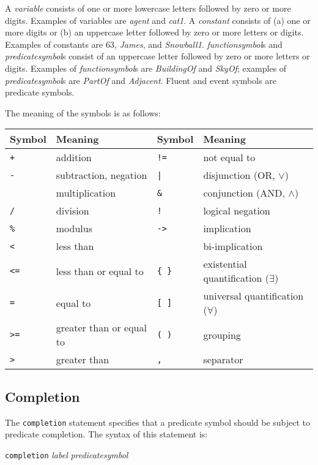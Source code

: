\documentclass{article}
\begin{document}
A {\em variable} consists of one or more lowercase letters followed by
zero or more digits. Examples of variables are {\em agent} and
{\em cat1}.
A {\em constant} consists of (a) one or more digits or (b) an
uppercase letter followed by zero or more letters or digits. Examples
of constants are 63, {\em James}, and {\em Snowball1}.
{\em functionsymbol}s and {\em predicatesymbol}s consist of an
uppercase letter followed by zero or more letters or digits. Examples
of {\em functionsymbol}s are {\em BuildingOf} and {\em SkyOf}; examples of
{\em predicatesymbol}s are {\em PartOf} and {\em Adjacent}.
Fluent and event symbols are predicate symbols.

The meaning of the symbols is as follows:
\begin{center}
\begin{tabular}{|l|l|l|l|} \hline
{\bf Symbol} & {\bf Meaning} & {\bf Symbol} & {\bf Meaning} \\ \hline
{\tt +} & addition &
{\tt !=} & not equal to \\ \hline
{\tt -}  & subtraction, negation &
{\tt |} & disjunction (OR, $\vee$) \\ \hline
{\tt *} & multiplication &
{\tt \&} & conjunction (AND, $\wedge$) \\ \hline
{\tt /} & division &
{\tt !} & logical negation \\ \hline
{\tt \%} & modulus &
{\tt ->} & implication \\ \hline
{\tt <} & less than &
{\tt <->} & bi-implication \\ \hline
{\tt <=} & less than or equal to &
{\tt \{ \}} & existential quantification ($\exists$) \\ \hline
{\tt =} & equal to &
{\tt [ ]} & universal quantification ($\forall$) \\ \hline
{\tt >=} & greater than or equal to &
{\tt ( )} & grouping \\ \hline
{\tt >} & greater than & {\tt ,} & separator \\ \hline
\end{tabular}
\end{center}

\subsection{Completion}
The {\tt completion} statement specifies that a predicate symbol should
be subject to predicate completion. The syntax of this statement is:
\begin{flushleft}
{\tt completion} {\em label} {\em predicatesymbol}
\end{flushleft}
\end{document}
